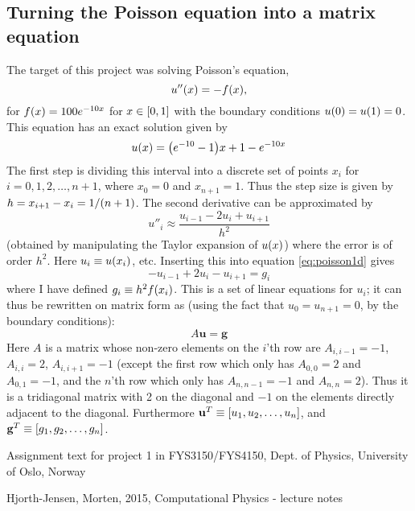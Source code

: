 \documentclass[a4paper,english]{article}
\renewcommand\vec{\mathbf}
\let\originalleft\left
\let\originalright\right
\renewcommand{\left}{\mathopen{}\mathclose\bgroup\originalleft}
\renewcommand{\right}{\aftergroup\egroup\originalright}
\begin{document}
\subsection{Turning the Poisson equation into a matrix equation}
The target of this project was solving Poisson's equation,
\begin{equation}
  u''\left(x\right) = -f\left(x\right)\text{,}
  \label{eq:poisson1d}
\end{equation}
for $f\left(x\right) = 100e^{-10x}$ for $x\in \left[0,1\right]$ with the boundary conditions $u\left(0\right) = u\left(1\right) = 0$. This equation has an exact solution given by \cite{assignment}
\begin{equation}
  u\left(x\right) = \left(e^{-10}-1\right)x+1-e^{-10x}
  \label{eq:u_exact}
\end{equation}
The first step is dividing this interval into a discrete set of points $x_i$ for $i = 0,1,2,\dots,n+1$, where $x_0 = 0$ and $x_{n+1} = 1$. Thus the step size is given by $h = x_{i+1}-x_i = 1/\left(n+1\right)$. The second derivative can be approximated by \cite{lecturenotes}
\begin{equation}
  u''_i \approx \frac{u_{i-1}-2u_i+u_{i+1}}{h^2}
\end{equation}
(obtained by manipulating the Taylor expansion of $u\left(x\right)$) where the error is of order $h^2$. Here $u_i \equiv u\left(x_i\right)$, etc. Inserting this into equation \ref{eq:poisson1d} gives
\begin{equation*}
  -u_{i-1}+2u_i-u_{i+1} = g_i
\end{equation*}
where I have defined $g_i \equiv h^2f\left(x_i\right)$. This is a set of linear equations for $u_i$; it can thus be rewritten on matrix form as (using the fact that $u_0 = u_{n+1} = 0$, by the boundary conditions):
\begin{equation}
  A \vec{u} = \vec{g}
  \label{eq:matrix_eq}
\end{equation}
Here $A$ is a matrix whose non-zero elements on the $i$'th row are $A_{i,i-1} = -1$, $A_{i,i} =2$, $A_{i,i+1} = -1$ (except the first row which only has $A_{0,0} = 2$ and $A_{0,1} = -1$, and the $n$'th row which only has $A_{n,n-1} = -1$ and $A_{n,n} = 2$). Thus it is a tridiagonal matrix with 2 on the diagonal and $-1$ on the elements directly adjacent to the diagonal. Furthermore $\vec{u}^T \equiv \left[u_1,u_2,\dots,u_n\right]$, and $\vec{g}^T \equiv \left[g_1,g_2,\dots,g_n\right]$.
\begin{thebibliography}{}
    Assignment text for project 1 in FYS3150/FYS4150,
    Dept. of Physics, University of Oslo, Norway

    Hjorth-Jensen, Morten,
    2015,
    Computational Physics - lecture notes
\end{thebibliography}
\end{document}
